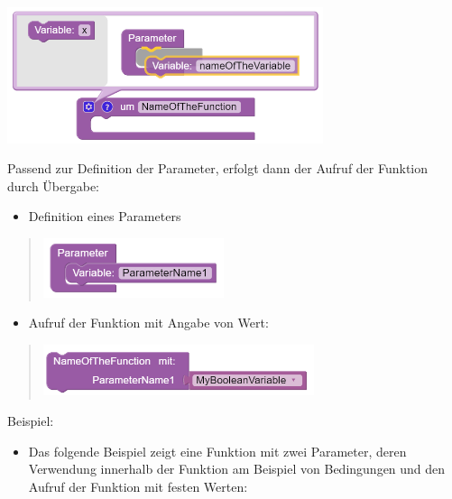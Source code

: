 \documentclass[
  letterpaper,
  DIV=11]{scrreprt}
\providecommand{\tightlist}{%
  \setlength{\itemsep}{0pt}\setlength{\parskip}{0pt}}\usepackage{longtable,booktabs,array}
\begin{document}
\begin{tcolorbox}
\includegraphics[width=3.64583in,height=\textheight]{img/screenshot-blockly-function-parameter-definition-example-DEU.png}

Passend zur Definition der Parameter, erfolgt dann der Aufruf der
Funktion durch Übergabe:

\begin{itemize}
\tightlist
\item
  Definition eines Parameters
\end{itemize}

\begin{quote}
\includegraphics[width=2.08333in,height=\textheight]{img/screenshot-blockly-function-parameter-definition-detail-example-01-DEU.png}
\end{quote}

\begin{itemize}
\tightlist
\item
  Aufruf der Funktion mit Angabe von Wert:
\end{itemize}

\begin{quote}
\includegraphics[width=3.125in,height=\textheight]{img/screenshot-blockly-function-with-parameter-call-detail-example-01-DEU.png}
\end{quote}

Beispiel:

\begin{itemize}
\tightlist
\item
  Das folgende Beispiel zeigt eine Funktion mit zwei Parameter, deren
  Verwendung innerhalb der Funktion am Beispiel von Bedingungen und den
  Aufruf der Funktion mit festen Werten:
\end{itemize}


\end{tcolorbox}
\end{document}
